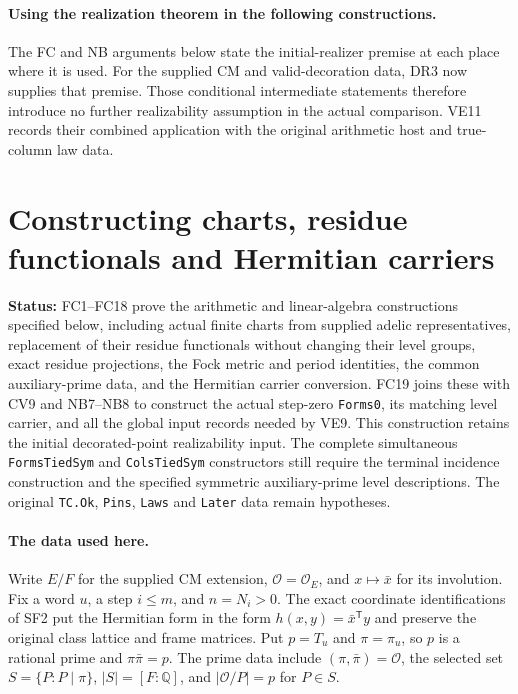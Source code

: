 \documentclass[11pt,a4paper]{article}
\numberwithin{equation}{section}
\theoremstyle{remark}\newtheorem{remark}[theorem]{Remark}
\newcommand{\status}[1]{\textbf{Status:} #1}
\begin{document}
\paragraph{Using the realization theorem in the following constructions.}
The FC and NB arguments below state the initial-realizer premise at each
place where it is used. For the supplied CM and valid-decoration data,
DR3 now supplies that premise. Those conditional intermediate statements
therefore introduce no further realizability assumption in the actual
comparison. VE11 records their combined application with the original
arithmetic host and true-column law data.

\section{Constructing charts, residue functionals and Hermitian carriers}
\label{sec:global-forms}

\status{FC1--FC18 prove the arithmetic and linear-algebra constructions
specified below, including actual finite charts from supplied adelic
representatives, replacement of their residue functionals without changing
their level groups, exact residue projections, the Fock metric and period
identities, the common auxiliary-prime data, and the Hermitian carrier
conversion. FC19 joins these with CV9 and NB7--NB8 to construct the
actual step-zero \texttt{Forms0}, its matching level carrier, and all
the global input records needed by VE9. This construction retains the
initial decorated-point realizability input. The complete simultaneous
\texttt{FormsTiedSym} and \texttt{ColsTiedSym} constructors still require
the terminal incidence construction and the specified symmetric
auxiliary-prime level descriptions. The original \texttt{TC.Ok},
\texttt{Pins}, \texttt{Laws} and \texttt{Later} data remain hypotheses.}

\paragraph{The data used here.}
Write $E/F$ for the supplied CM extension, $\mathcal O=\mathcal O_E$,
and $x\mapsto\bar x$ for its involution. Fix a word $u$, a step $i\le m$,
and $n=N_i>0$. The exact coordinate identifications of SF2 put the
Hermitian form in the form $h(x,y)=\bar x^{\mathsf T}y$ and preserve the
original class lattice and frame matrices. Put $p=T_u$ and
$\pi=\pi_u$, so $p$ is a rational prime and
$\pi\bar\pi=p$. The prime data include
$(\pi,\bar\pi)=\mathcal O$, the selected set
$S=\{P:P\mid\pi\}$, $|S|=[F:\mathbb Q]$, and
$|\mathcal O/P|=p$ for $P\in S$.
\end{document}

